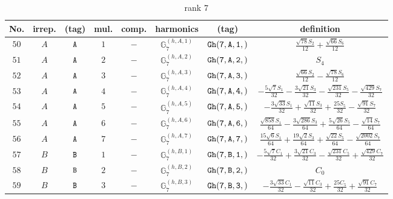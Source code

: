 \documentclass[fleqn,8pt]{jsarticle}
\begin{document}
\begin{table}[ht!]
\begin{center}
\caption{rank 7}
\renewcommand{\arraystretch}{1.3}
\begin{tabular}{cccccccc} \hline \hline
No. & irrep. & (tag) & mul. & comp. & harmonics & (tag) & definition \\ \hline
$ 50 $ & $ A $ & $ {\tt A} $ & $ 1 $ & $ - $ & $ \mathbb{G}_{7}^{(h,A,1)} $ & $ {\tt Gh(7,A,1,)} $ & $ \frac{\sqrt{78} S_{2}}{12} + \frac{\sqrt{66} S_{6}}{12} $ \\
$ 51 $ & $ A $ & $ {\tt A} $ & $ 2 $ & $ - $ & $ \mathbb{G}_{7}^{(h,A,2)} $ & $ {\tt Gh(7,A,2,)} $ & $ S_{4} $ \\
$ 52 $ & $ A $ & $ {\tt A} $ & $ 3 $ & $ - $ & $ \mathbb{G}_{7}^{(h,A,3)} $ & $ {\tt Gh(7,A,3,)} $ & $ \frac{\sqrt{66} S_{2}}{12} - \frac{\sqrt{78} S_{6}}{12} $ \\
$ 53 $ & $ A $ & $ {\tt A} $ & $ 4 $ & $ - $ & $ \mathbb{G}_{7}^{(h,A,4)} $ & $ {\tt Gh(7,A,4,)} $ & $ - \frac{5 \sqrt{7} S_{1}}{32} - \frac{3 \sqrt{21} S_{3}}{32} - \frac{\sqrt{231} S_{5}}{32} - \frac{\sqrt{429} S_{7}}{32} $ \\
$ 54 $ & $ A $ & $ {\tt A} $ & $ 5 $ & $ - $ & $ \mathbb{G}_{7}^{(h,A,5)} $ & $ {\tt Gh(7,A,5,)} $ & $ - \frac{3 \sqrt{33} S_{1}}{32} + \frac{\sqrt{11} S_{3}}{32} + \frac{25 S_{5}}{32} - \frac{\sqrt{91} S_{7}}{32} $ \\
$ 55 $ & $ A $ & $ {\tt A} $ & $ 6 $ & $ - $ & $ \mathbb{G}_{7}^{(h,A,6)} $ & $ {\tt Gh(7,A,6,)} $ & $ \frac{\sqrt{858} S_{1}}{64} - \frac{3 \sqrt{286} S_{3}}{64} + \frac{5 \sqrt{26} S_{5}}{64} - \frac{\sqrt{14} S_{7}}{64} $ \\
$ 56 $ & $ A $ & $ {\tt A} $ & $ 7 $ & $ - $ & $ \mathbb{G}_{7}^{(h,A,7)} $ & $ {\tt Gh(7,A,7,)} $ & $ \frac{15 \sqrt{6} S_{1}}{64} + \frac{19 \sqrt{2} S_{3}}{64} + \frac{\sqrt{22} S_{5}}{64} - \frac{\sqrt{2002} S_{7}}{64} $ \\
$ 57 $ & $ B $ & $ {\tt B} $ & $ 1 $ & $ - $ & $ \mathbb{G}_{7}^{(h,B,1)} $ & $ {\tt Gh(7,B,1,)} $ & $ - \frac{5 \sqrt{7} C_{1}}{32} + \frac{3 \sqrt{21} C_{3}}{32} - \frac{\sqrt{231} C_{5}}{32} + \frac{\sqrt{429} C_{7}}{32} $ \\
$ 58 $ & $ B $ & $ {\tt B} $ & $ 2 $ & $ - $ & $ \mathbb{G}_{7}^{(h,B,2)} $ & $ {\tt Gh(7,B,2,)} $ & $ C_{0} $ \\
$ 59 $ & $ B $ & $ {\tt B} $ & $ 3 $ & $ - $ & $ \mathbb{G}_{7}^{(h,B,3)} $ & $ {\tt Gh(7,B,3,)} $ & $ - \frac{3 \sqrt{33} C_{1}}{32} - \frac{\sqrt{11} C_{3}}{32} + \frac{25 C_{5}}{32} + \frac{\sqrt{91} C_{7}}{32} $ \\

\end{tabular}
\end{center}
\end{table}
\end{document}
